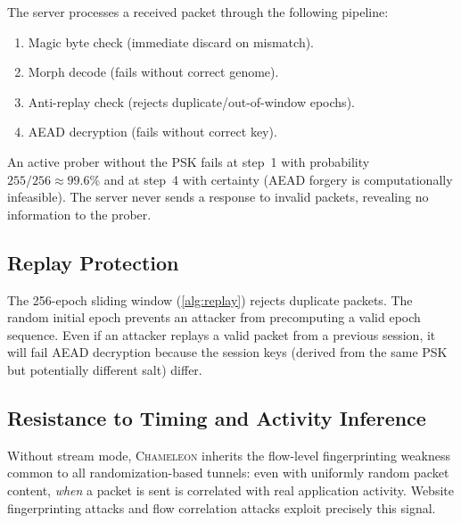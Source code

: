 \documentclass[11pt,a4paper]{article}
\newcommand{\chameleon}{\textsc{Chameleon}}
\begin{document}
The server processes a received packet through the following pipeline:
\begin{enumerate}[nosep]
  \item Magic byte check (immediate discard on mismatch).
  \item Morph decode (fails without correct genome).
  \item Anti-replay check (rejects duplicate/out-of-window epochs).
  \item AEAD decryption (fails without correct key).
\end{enumerate}

An active prober without the PSK fails at step~1 with probability $255/256 \approx 99.6\%$ and at step~4 with certainty (AEAD forgery is computationally infeasible). The server never sends a response to invalid packets, revealing no information to the prober.

\subsection{Replay Protection}

The 256-epoch sliding window (\cref{alg:replay}) rejects duplicate packets. The random initial epoch prevents an attacker from precomputing a valid epoch sequence. Even if an attacker replays a valid packet from a previous session, it will fail AEAD decryption because the session keys (derived from the same PSK but potentially different salt) differ.

\subsection{Resistance to Timing and Activity Inference}\label{sec:timing_analysis}

Without stream mode, \chameleon{} inherits the flow-level fingerprinting weakness common to all randomization-based tunnels: even with uniformly random packet content, \emph{when} a packet is sent is correlated with real application activity. Website fingerprinting attacks \cite{cai2012touching,panchenko2016website} and flow correlation attacks \cite{nasr2018deepcorr} exploit precisely this signal.
\end{document}
